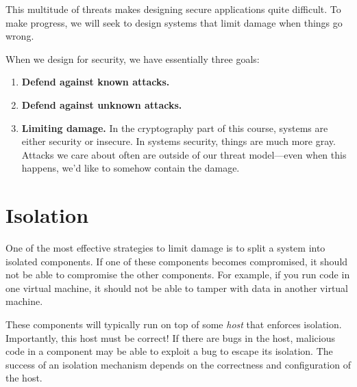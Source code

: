 \documentclass[
  letterpaper,
]{scrbook}
\providecommand{\tightlist}{%
  \setlength{\itemsep}{0pt}\setlength{\parskip}{0pt}}
\theoremstyle{definition}
\theoremstyle{plain}
\theoremstyle{plain}
\theoremstyle{remark}
\begin{document}
This multitude of threats makes designing secure applications quite
difficult. To make progress, we will seek to design systems that limit
damage when things go wrong.

When we design for security, we have essentially three goals:

\begin{enumerate}
\def\labelenumi{\arabic{enumi}.}
\tightlist
\item
  \textbf{Defend against known attacks.}
\item
  \textbf{Defend against unknown attacks.}
\item
  \textbf{Limiting damage.} In the cryptography part of this course,
  systems are either security or insecure. In systems security, things
  are much more gray. Attacks we care about often are outside of our
  threat model---even when this happens, we'd like to somehow contain
  the damage.
\end{enumerate}

\section{Isolation}\label{isolation}

One of the most effective strategies to limit damage is to split a
system into isolated components. If one of these components becomes
compromised, it should not be able to compromise the other components.
For example, if you run code in one virtual machine, it should not be
able to tamper with data in another virtual machine.


These components will typically run on top of some \emph{host} that
enforces isolation. Importantly, this host must be correct! If there are
bugs in the host, malicious code in a component may be able to exploit a
bug to escape its isolation. The success of an isolation mechanism
depends on the correctness and configuration of the host.
\end{document}
